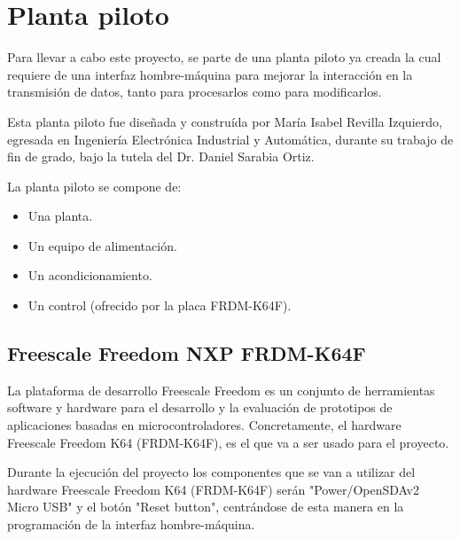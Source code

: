 

\section{Planta piloto}

Para llevar a cabo este proyecto, se parte de una planta piloto ya creada la cual requiere de una interfaz hombre-máquina para mejorar la interacción en la transmisión de datos, tanto para procesarlos como para modificarlos.

Esta planta piloto fue diseñada y construída por María Isabel Revilla Izquierdo, egresada en Ingeniería Electrónica Industrial y Automática, durante su trabajo de fin de grado, bajo la tutela del Dr. Daniel Sarabia Ortiz.

La planta piloto se compone de:
\begin{itemize}
	\item Una planta.
	\item Un equipo de alimentación.
	\item Un acondicionamiento.
	\item Un control (ofrecido por la placa FRDM-K64F).
\end{itemize} 


\subsection{Freescale Freedom NXP FRDM-K64F}

La plataforma de desarrollo Freescale Freedom es un conjunto de herramientas software y hardware para el desarrollo y la evaluación de prototipos de aplicaciones basadas en microcontroladores. Concretamente, el hardware Freescale Freedom K64 (FRDM-K64F), es el que va a ser usado para el proyecto.


Durante la ejecución del proyecto los componentes que se van a utilizar del hardware Freescale Freedom K64 (FRDM-K64F) serán "Power/OpenSDAv2 Micro USB" y el botón "Reset button", centrándose de esta manera en la programación de la interfaz hombre-máquina.

